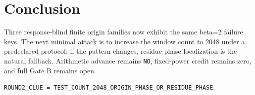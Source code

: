 \documentclass[10pt]{article}
\begin{document}
\section{Conclusion}

Three response-blind finite origin families now exhibit the same beta=2
failure keys.  The next minimal attack is to increase the window count to
2048 under a predeclared protocol; if the pattern changes, residue-phase
localization is the natural fallback.  Arithmetic advance remains \texttt{NO},
fixed-power credit remains zero, and full Gate B remains open.

\begin{center}\small
\texttt{ROUND2\_CLUE = TEST\_COUNT\_2048\_ORIGIN\_PHASE\_OR\_RESIDUE\_PHASE}.
\end{center}
\end{document}
